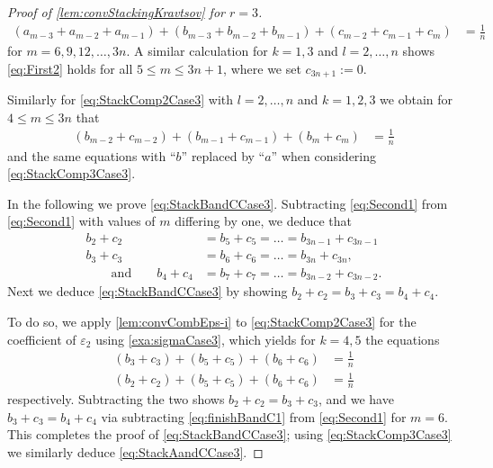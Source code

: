 \documentclass[10pt,a4paper]{article}
\numberwithin{equation}{section}
\newcommand{\eps}{\varepsilon}
\begin{document}
\begin{proof}[Proof of \cref{lem:convStackingKravtsov} for $r=3$]
 \begin{align}
	(a_{m-3} + a_{m-2} + a_{m-1}) + (b_{m-3} + b_{m-2} + b_{m-1})  + (c_{m-2} + c_{m-1} + c_{m}) &= \frac{1}{n} \label{eq:First2}
		\end{align}
for $m = 6,9,12,\dots, 3n$. A similar calculation for $k=1,3$ and $l=2,\ldots,n$ shows \cref{eq:First2} holds for all $5 \leq m \leq 3n +1$, where we set  $c_{3 n + 1} := 0$.


Similarly for \cref{eq:StackComp2Case3} with $l=2,\ldots,n$ and $k=1,2,3$ we obtain for $4 \leq m \leq 3n$ that
	\begin{align}
	(b_{m-2} + c_{m-2})  + (b_{m-1} + c_{m-1}) + (b_{m} + c_m)  &= \frac{1}{n} \label{eq:Second1} 
	\end{align}
and the same equations with ``$b$'' replaced by ``$a$'' when considering \cref{eq:StackComp3Case3}.

In the following we prove \cref{eq:StackBandCCase3}. Subtracting \eqref{eq:Second1} from \eqref{eq:Second1} with values of $m$ differing by one, we deduce that 
\begin{align*}
	b_{2} + c_2 &= b_5 + c_5 = \ldots = b_{3n-1} + c_{3n-1}\\
	b_3 + c_3 &= b_6 + c_6 = \ldots = b_{3n} + c_{3n}, \\
	\qquad \text{and} \qquad b_4 + c_4 &= b_7 + c_7 = \ldots = b_{3n-2} + c_{3n-2}.
	\end{align*}
Next we deduce \cref{eq:StackBandCCase3} by showing $b_2 + c_2 = b_3 + c_3 = b_4 + c_4$. 

To do so, we apply  \cref{lem:convCombEps-i} to \eqref{eq:StackComp2Case3} for the coefficient of $\eps_2$ using \cref{exa:sigmaCase3}, which yields for $k=4,5$ the equations
	\begin{align}
	(b_3 + c_3) + (b_5 + c_5) + (b_6 + c_6)  &= \frac{1}{n}  \label{eq:finishBandC1}\\
	(b_2 + c_2) + (b_5 + c_5) + (b_6  + c_6)  &= \frac{1}{n} \label{eq:finishBandC2}
	\end{align}
respectively. Subtracting the two shows $b_2 + c_2  = b_3 + c_3$, and we have $b_3 + c_3  = b_4 + c_4$ via subtracting \eqref{eq:finishBandC1} from \eqref{eq:Second1} for $m=6$. This completes the proof of \cref{eq:StackBandCCase3}; using \cref{eq:StackComp3Case3} we similarly deduce \cref{eq:StackAandCCase3}.


\end{proof}
\end{document}
